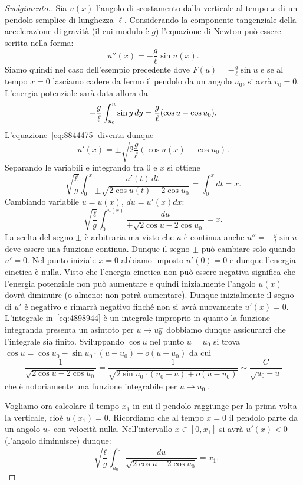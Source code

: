 \begin{example}
%
%
%
%
\end{example}
\begin{proof}[Svolgimento.]
Sia $u(x)$
l'angolo di scostamento dalla verticale
al tempo $x$ di un pendolo semplice di lunghezza $\ell$.
Considerando la componente tangenziale della accelerazione di gravità
(il cui modulo è $g$)
l'equazione di Newton può essere scritta nella forma:
\[
  u''(x) = -\frac{g}{\ell} \sin u(x).
\]
Siamo quindi nel caso dell'esempio precedente dove $F(u) = -\frac{g}{\ell} \sin u$
e se al tempo $x=0$ lasciamo cadere da fermo il pendolo da un angolo $u_0$,
si avrà $v_0=0$. L'energia potenziale sarà data allora da
\[
-\frac{g}{\ell}\int_{u_0}^u \sin y\, dy = \frac{g}{\ell}{\left( \cos u - \cos u_0 \right)}.
\]
L'equazione~\eqref{eq:8844475} diventa dunque
\[
  u'(x) = \pm \sqrt{2\frac{g}{\ell}(\cos u(x) - \cos u_0)}.
\]
Separando le variabili e integrando tra $0$ e $x$ si ottiene
\[
\sqrt{\frac \ell g}\int_0^x \frac{u'(t)\, dt}{\pm\sqrt{2\cos u(t)-2\cos u_0}}
= \int_0^x dt  = x.
\]
Cambiando variabile $u=u(x)$, $du = u'(x) dx$:
\begin{equation}\label{eq:4898944}
\sqrt{\frac \ell g}\int_0^{u(x)} \frac{du}{\pm\sqrt{2\cos u-2\cos u_0}} = x.
\end{equation}
La scelta del segno $\pm$ è arbitraria ma visto che $u$ è continua
anche $u''=-\frac g l \sin u$ deve essere una funzione continua. Dunque il segno
$\pm$ può cambiare solo quando $u'=0$. Nel punto iniziale $x=0$ abbiamo
imposto $u'(0) = 0$ e dunque l'energia cinetica è nulla. Visto che l'energia
cinetica non può essere negativa significa che l'energia potenziale
non può aumentare e quindi inizialmente l'angolo $u(x)$ dovrà diminuire
(o almeno: non potrà aumentare). Dunque inizialmente il segno di $u'$ è negativo
e rimarrà negativo finché non si avrà nuovamente $u'(x)=0$.
L'integrale in~\eqref{eq:4898944} è un integrale improprio in quanto
la funzione integranda presenta un asintoto per $u\to u_0^-$ dobbiamo dunque
assicurarci che l'integrale sia finito. Sviluppando $\cos u$ nel punto $u=u_0$
si trova $\cos u = \cos u_0  - \sin u_0 \cdot (u-u_0) + o(u-u_0)$ da cui
\[
 \frac{1}{\sqrt{2 \cos u - 2 \cos u_0}}
 =\frac{1}{\sqrt{2\sin u_0\cdot (u_0-u) + o(u-u_0)}}
 \sim \frac{C}{\sqrt{u_0-u}}
\]
che è notoriamente una funzione integrabile per $u\to u_0^-$.

Vogliamo ora calcolare il tempo $x_1$ in cui il pendolo raggiunge per la prima
volta la verticale, cioè $u(x_1)=0$.
Ricordiamo che al tempo $x=0$ il pendolo parte da un angolo $u_0$
con velocità nulla. Nell'intervallo $x\in[0,x_1]$ si avrà $u'(x)<0$
(l'angolo diminuisce) dunque:
\[
-\sqrt{\frac{\ell}{g}}\int_{u_0}^{0} \frac{du}{\sqrt{2\cos u - 2\cos u_0}}
= x_1.
\]


\end{proof}
